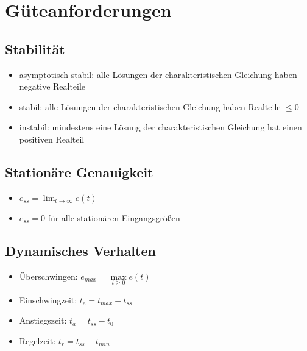 \documentclass[german]{latex4ei/latex4ei_sheet}
\begin{document}
\section{Güteanforderungen}
\begin{sectionbox}
        \subsection{Stabilität}
    \vspace{1mm}
    \begin{itemize}
        \item asymptotisch stabil: alle Lösungen der charakteristischen Gleichung haben negative Realteile
        \item stabil: alle Lösungen der charakteristischen Gleichung haben Realteile $\leq 0$
        \item instabil: mindestens eine Lösung der charakteristischen Gleichung hat einen positiven Realteil
    \end{itemize}

    \subsection{Stationäre Genauigkeit}
    \vspace{1mm}
    \begin{itemize}
        \item $e_{ss} = \lim_{t \to \infty} e(t)$
        \item $e_{ss} = 0$ für alle stationären Eingangsgrößen
    \end{itemize}
    \subsection{Dynamisches Verhalten}
    \vspace{1mm}
    \begin{itemize}
        \item Überschwingen: $e_{max} = \max\limits_{t \geq 0} e(t)$
        \item Einschwingzeit: $t_e = t_{max} - t_{ss}$
        \item Anstiegszeit: $t_a = t_{ss} - t_0$
        \item Regelzeit: $t_r = t_{ss} - t_{min}$
    \end{itemize}

\end{sectionbox}
\end{document}
